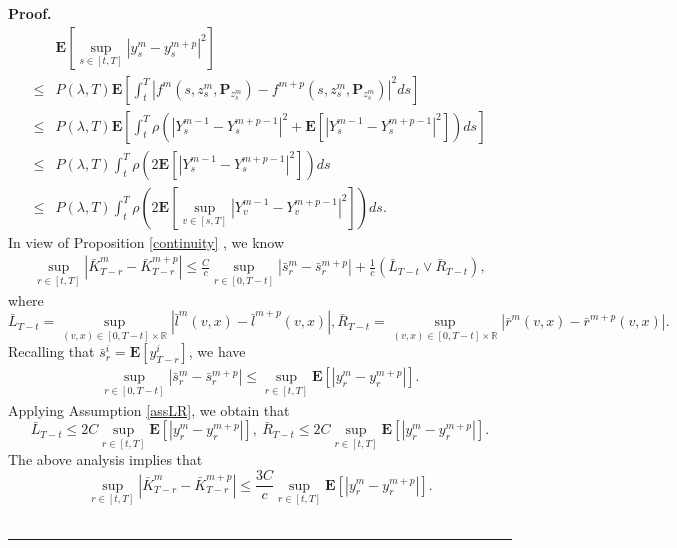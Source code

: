 \documentclass[10pt]{article}%
\numberwithin{equation}{section}
\newenvironment{proof}[1][Proof]{\noindent \textbf{#1.} }{\  \rule{0.5em}{0.5em}}
\def \E{\mathbf{E}}
\begin{document}
\begin{proof}
\begin{equation}
     \begin{split}
      &\E\left[\sup_{s\in[t,T]}\left|y_s^m-y_s^{m+p}\right|^2\right]\\
      \leq &P(\lambda,T)\mathbf{E}\left[\int_t^T \left|f^m(s,z^m_s,\mathbf{P}_{z^m_s})-f^{m+p}(s,z^m_s,\mathbf{P}_{z^m_s})\right|^2ds\right]\\
      \leq& P(\lambda,T)\mathbf{E}\left[\int_{t}^{T}\rho\left(\left|Y_s^{m-1}-Y_{s}^{m+p-1}\right|^2+\mathbf{E}\left[\left|Y_s^{m-1}-Y_{s}^{m+p-1}\right|^2\right]\right)ds\right]\\
      \leq& P(\lambda,T)\int_{t}^{T}\rho\left(2\mathbf{E}\left[\left|Y_s^{m-1}-Y_{s}^{m+p-1}\right|^2\right]\right)ds\\
      \leq& P\left(\lambda, T\right)\int_{t}^{T}\rho\left(2\mathbf{E}\left[\sup_{v\in[s,T]}\left|Y_v^{m-1}-Y_{v}^{m+p-1}\right|^2\right]\right)ds.
\end{split}
 \end{equation}
 In view of Proposition \ref{continuity} , we know
\begin{equation*}\begin{split}
 \sup_{r \in[t, T]}\left|\bar{K}^m_{T-r}-\bar{K}^{m+p}_{T-r}\right|%
 \leq \frac{C}{c}\sup_{r \in[0, T-t]}\left|\bar{s}^m_r-\bar{s}^{m+p}_r\right|+\frac{1}{c}(\bar{L}_{T-t} \vee \bar{R}_{T-t}),
 \end{split}    
\end{equation*}
where $$\bar{L}_{T-t}=\sup_{(v,x)\in[0, T-t]\times \mathbb{R}}|\bar{l}^m(v,x)-\bar{l}^{m+p}(v,x)|,
\bar{R}_{T-t}=\sup_{(v,x)\in[0, T-t]\times \mathbb{R}}|\bar{r}^m(v,x)-\bar{r}^{m+p}(v,x)|.$$
Recalling that  $\bar{s}^i_r=\mathbf{E}[y^i_{T-r}]$, we have 
\begin{align*}
	\sup_{r\in[0, T-t]}|\bar{s}^m_r-\bar{s}^{m+p}_r|
    \leq \sup_{r \in[t, T]}\mathbf{E}\left[\left|y^m_{r}-y^{m+p}_{r}\right|\right].
	\end{align*}
Applying Assumption \ref{assLR}, we obtain that 
\begin{equation*}
	\bar{L}_{T-t}\leq 2C\sup_{r \in[t, T]}\mathbf{E}\left[\left|y^m_{r}-y^{m+p}_{r}\right|\right],\ \bar{R}_{T-t}\leq 2C\sup_{r \in[t, T]}\mathbf{E}\left[\left|y^m_{r}-y^{m+p}_{r}\right|\right].
\end{equation*}
 The above analysis implies that 
\begin{equation}\label{kmkmp}
	\sup_{r \in[t, T]}\left|\bar{K}^m_{T-r}-\bar{K}^{m+p}_{T-r}\right|
	\leq \frac{3C}{c}\sup_{r \in[t, T]}\mathbf{E}\left[\left|y^m_{r}-y^{m+p}_{r}\right|\right].

\end{equation}
\end{proof}
\end{document}
